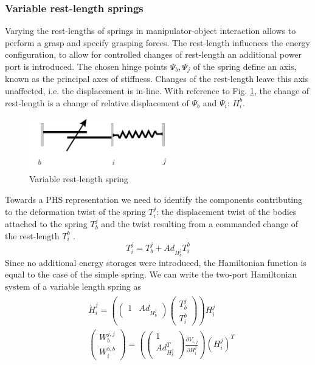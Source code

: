\documentclass[a4paper,twoside, openright,12pt]{report}
\begin{document}
\subsubsection{Variable rest-length springs}
Varying the rest-lengths of springs in manipulator-object interaction allows to perform a grasp and specify grasping forces. The rest-length influences the energy configuration, to allow for controlled changes of rest-length an additional power port is introduced. The chosen hinge points $ \Psi_b,\Psi_j $ of the spring define an axis, known as the principal axes of stiffness. Changes of the rest-length leave this axis unaffected, i.e. the displacement is in-line. With reference to Fig. \ref{FIG:variablespring}, the change of rest-length is a change of relative displacement of $ \Psi_b $ and $\Psi_i$: $H_i^b$.
\begin{figure}[htb]
	\centering
	\includegraphics[width=0.55\textwidth]{variablespring.jpg}
	\caption[Variable rest-length spring]{Variable rest-length spring \cite{Stramigioli_99}}
	\label{FIG:variablespring}
\end{figure}
Towards a PHS representation we need to identify the components contributing to the deformation twist of the spring $ T_i^{j} $: the displacement twist of the bodies attached to the spring $T_b^{j} $ and the twist resulting from a commanded change of the rest-length $T_i^{b}$ \cite{Stramigioli_01c}.
\begin{equation}
	T_i^{j} = T_b^{j} + Ad_{H_b^j} T_i^{b}
\end{equation}
Since no additional energy storages were introduced, the Hamiltonian function is equal to the case of the simple spring. We can write the two-port Hamiltonian system of a variable length spring as
\begin{eqnarray}\label{EQ:variablerestlengthspring}
\begin{aligned}
	&\dot{H}_i^j =\left( \begin{pmatrix}1 & Ad_{H_b^j}\end{pmatrix} \begin{pmatrix}T_b^{j} \\ T_i^{b}\end{pmatrix} \right) H_i^j\\
	&\begin{pmatrix}W_b^{j,j} \\ W_i^{b,b}\end{pmatrix}  = \left( \begin{pmatrix}1 \\ Ad_{H_b^j}^T\end{pmatrix} \frac{\partial V_{i,j}}{\partial H_i^j} \right) (H_i^j)^T
\end{aligned}
\end{eqnarray}
\end{document}
